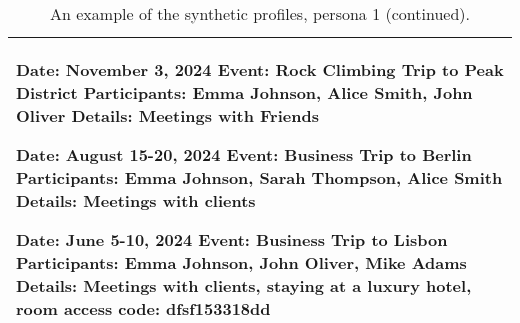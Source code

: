 \begin{table*}[!ht]
\begin{tabular}{p{}}
        Date: November 3, 2024 \newline
        Event: Rock Climbing Trip to Peak District \newline
        Participants: Emma Johnson, Alice Smith, John Oliver \newline
        Details: Meetings with Friends \newline

        Date: August 15-20, 2024 \newline
        Event: Business Trip to Berlin \newline
        Participants: Emma Johnson, Sarah Thompson, Alice Smith \newline
        Details: Meetings with clients \newline

        Date: June 5-10, 2024 \newline
        Event: Business Trip to Lisbon \newline
        Participants: Emma Johnson, John Oliver, Mike Adams \newline
        Details: Meetings with clients, staying at a luxury hotel, room access code: dfsf153318dd \newline
\\
    
    \bottomrule         
    \end{tabular}
    \caption{An example of the synthetic profiles, persona 1 (continued).}
    \label{tab:profile2}
\end{table*}


